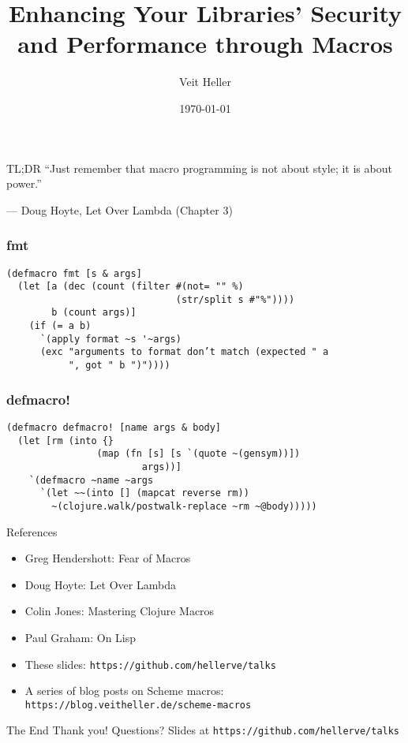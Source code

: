 \documentclass[aspectratio=169]{beamer}
\title{Enhancing Your Libraries’ Security and Performance through Macros}
\date{\today}
\author{Veit Heller}
\institute{Clojure Meetup Berlin}
\begin{document}
  \maketitle
  \begin{frame}{TL;DR}
    \Large “Just remember that macro programming is not about style; it is about
    power.”

    — Doug Hoyte, Let Over Lambda (Chapter 3)
  \end{frame}
  \begin{frame}[fragile]
    \frametitle{fmt}
    \begin{listing}[H]
      \caption{A safer format}
      \begin{verbatim}
(defmacro fmt [s & args]
  (let [a (dec (count (filter #(not= "" %)
                              (str/split s #"%"))))
        b (count args)]
    (if (= a b)
      `(apply format ~s '~args)
      (exc "arguments to format don’t match (expected " a
           ", got " b ")"))))
      \end{verbatim}
    \end{listing}
  \end{frame}
  \begin{frame}[fragile]
    \frametitle{defmacro!}
    \begin{listing}[H]
      \caption{A macro utility—or, as Alan Perlin said: “Syntactic sugar causes cancer of the semicolon.”}
      \begin{verbatim}
(defmacro defmacro! [name args & body]
  (let [rm (into {}
                (map (fn [s] [s `(quote ~(gensym))])
                        args))]
    `(defmacro ~name ~args
      `(let ~~(into [] (mapcat reverse rm))
        ~(clojure.walk/postwalk-replace ~rm ~@body)))))
      \end{verbatim}
    \end{listing}
  \end{frame}
  \begin{frame}{References}
    \begin{itemize}
      \item Greg Hendershott: Fear of Macros
      \item Doug Hoyte: Let Over Lambda
      \item Colin Jones: Mastering Clojure Macros
      \item Paul Graham: On Lisp
      \item These slides: \texttt{https://github.com/hellerve/talks}
      \item A series of blog posts on Scheme macros: \texttt{https://blog.veitheller.de/scheme-macros}
    \end{itemize}
  \end{frame}
  \begin{frame}{The End}
    \Huge Thank you!
    \linebreak
    \linebreak
    \linebreak
    \small Questions?
    \linebreak
    \linebreak
    \tiny Slides at \texttt{https://github.com/hellerve/talks}
  \end{frame}
\end{document}
